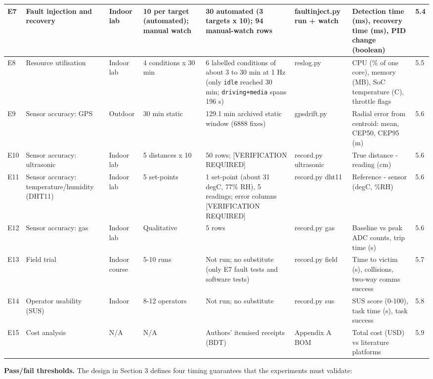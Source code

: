\begin{center}
\begin{longtable}{|p{0.5cm}|p{2.1cm}|p{1.6cm}|p{1.1cm}|p{2.6cm}|p{1.6cm}|p{2.6cm}|p{0.8cm}|}
E7 & Fault injection and recovery & Indoor lab & 10 per target (automated); manual watch & 30 automated (3 targets x 10); 94 manual-watch rows & faultinject.py run + watch & Detection time (ms), recovery time (ms), PID change (boolean) & 5.4 \\
\hline
E8 & Resource utilisation & Indoor lab & 4 conditions x 30 min & 6 labelled conditions of about 3 to 30 min at 1 Hz (only \texttt{idle} reached 30 min; \texttt{driving+media} spans 196 s) & reslog.py & CPU (\% of one core), memory (MB), SoC temperature (C), throttle flags & 5.5 \\
\hline
E9 & Sensor accuracy: GPS & Outdoor & 30 min static & 129.1 min archived static window (6888 fixes) & gpsdrift.py & Radial error from centroid: mean, CEP50, CEP95 (m) & 5.6 \\
\hline
E10 & Sensor accuracy: ultrasonic & Indoor lab & 5 distances x 10 & 50 rows; [VERIFICATION REQUIRED] & record.py ultrasonic & True distance - reading (cm) & 5.6 \\
\hline
E11 & Sensor accuracy: temperature/humidity (DHT11) & Indoor lab & 5 set-points & 1 set-point (about 31 degC, 77\% RH), 5 readings; error columns [VERIFICATION REQUIRED] & record.py dht11 & Reference - sensor (degC, \%RH) & 5.6 \\
\hline
E12 & Sensor accuracy: gas & Indoor lab & Qualitative & 5 rows & record.py gas & Baseline vs peak ADC counts, trip time (s) & 5.6 \\
\hline
E13 & Field trial & Indoor course & 5-10 runs & Not run; no substitute (only E7 fault tests and software tests) & record.py field & Time to victim (s), collisions, two-way comms success & 5.7 \\
\hline
E14 & Operator usability (SUS) & Indoor & 8-12 operators & Not run; no substitute & record.py sus & SUS score (0-100), task time (s), task success & 5.8 \\
\hline
E15 & Cost analysis & N/A & N/A & Authors' itemised receipts (BDT) & Appendix A BOM & Total cost (USD) vs literature platforms & 5.9 \\
\hline
\end{longtable}
\end{center}

\textbf{Pass/fail thresholds.} The design in Section 3 defines four timing guarantees that the experiments must validate:

